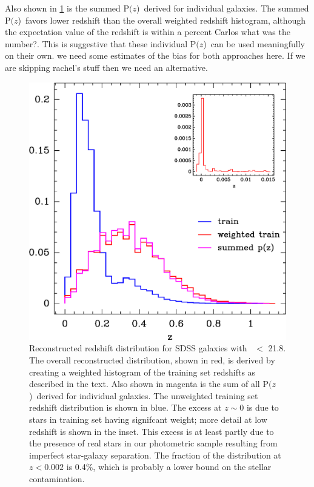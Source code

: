 \documentclass[preprint]{aastex}
\newcommand{\rmax}{21.8}
\newcommand{\pofz}{P$(z$)}
\begin{document}
Also shown in \ref{fig:pofz} is the summed \pofz\ derived for individual
galaxies.  The summed \pofz\ favors lower redshift than the overall weighted
redshift histogram, although the expectation value of the redshift is within a
percent {\color{red} Carlos what was the number?}.  This is suggestive that
these individual \pofz\ can be used meaningfully on their own. {\color{red} 
we need some estimates of the bias for both approaches here.  If we are
skipping rachel's stuff then we need an alternative.}

\begin{figure}[t] \centering
    \includegraphics[scale=0.9]{figures/zweight-09-zhist-withorig-withsum-11.eps}

    \caption{Reconstructed redshift distribution for SDSS galaxies with \rmag\
    $ < $ \rmax.  The overall reconstructed distribution, shown in red, is
    derived by creating a weighted histogram of the training set redshifts as
    described in the text.  Also shown in magenta is the sum of all \pofz\
    derived for individual galaxies.  The unweighted training set redshift
    distribution is shown in blue.  The excess at $z \sim 0$ is due to stars in
    training set having signifcant weight; more detail at low redshift is shown
    in the inset.  This excess is at least partly due to the presence of real
    stars in our photometric sample resulting from imperfect star-galaxy
    separation.  The fraction of the distribution at $z < 0.002$ is 0.4\%,
    which is probably a lower bound on the stellar contamination.
    \label{fig:pofz}}

    \vspace{2em}
\end{figure}
\end{document}
